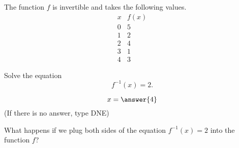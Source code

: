 \documentclass{ximera}
\author{Bobby Ramsey}
\begin{document}
\begin{exercise}




The function $f$ is invertible and takes the following values.
\[
\begin{array}{c|c}
  x & f(x)\\\hline
  0 & 5\\
  1 & 2\\
  2 & 4\\
  3 & 1\\
  4 & 3
\end{array}
\]

Solve the equation \[ f^{-1}(x) = 2. \]

\[ x = \answer{4}\]
(If there is no answer, type DNE)
\begin{hint}
	What happens if we plug both sides of the equation $f^{-1}(x) = 2$ into the function $f$?
\end{hint}

\end{exercise}
\end{document}
